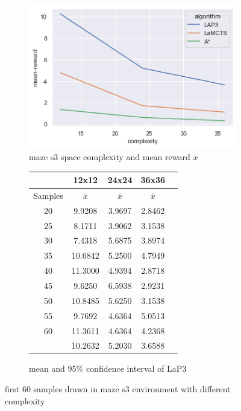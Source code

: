 \documentclass[bibliography=totoc]{scrartcl}
\begin{document}
\begin{figure}[H]
	\centering
	\begin{subfigure}[b]{0.55\linewidth}
    	\includegraphics[width = {\textwidth}]{img/maze_complexity_reward_lap3_lamcts_astar.png}
    	\caption{maze s3 space complexity and mean reward $\overline{x}$}
    	\label{fig:maze_complexity_reward_lap3_lamcts_astar}	
    \end{subfigure}
    \begin{subfigure}[b]{0.4\linewidth}
        \begin{tabular}{|c|c|c|c|c|}
        \hline
        & {12x12} & {24x24} & {36x36} \\ \hline
        Samples & $\overline{x}$ & $\overline{x}$ &  $\overline{x}$ \\ \hline
        20 &  9.9208     & 3.9697  & 2.8462 \\ \hline
        25 &  8.1711     & 3.9062  & 3.1538 \\ \hline
        30 &  7.4318     & 5.6875  & 3.8974 \\ \hline
        35 & 10.6842     & 5.2500  & 4.7949 \\ \hline
        40 & 11.3000     & 4.9394  & 2.8718 \\ \hline
        45 &  9.6250     & 6.5938  & 2.9231 \\ \hline
        50 & 10.8485     & 5.6250  & 3.1538 \\ \hline
        55 &  9.7692     & 4.6364  & 5.0513 \\ \hline
        60 & 11.3611     & 4.6364  & 4.2368 \\ \hline \hline
           & 10.2632     & 5.2030  & 3.6588 \\ \hline
        \end{tabular}
        \caption{mean and 95\% confidence interval of \ac{LaP3}}
        \label{tab:mean_std_diff_sizes}
    \end{subfigure}
    \caption{first 60 samples drawn in maze s3 environment with different complexity}
\end{figure}
\end{document}
